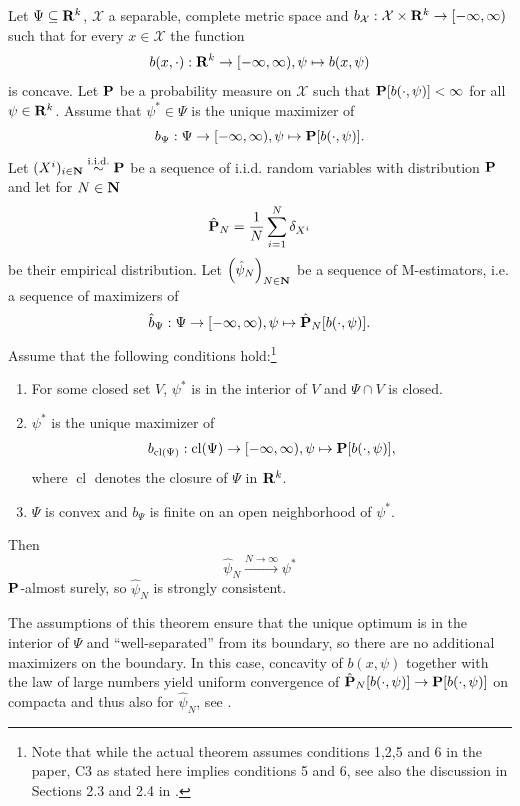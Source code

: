 \begin{theorem}
    \label{thm:haberman-consistent}
    Let $\Psi \subseteq \R^{k}$, $\mathcal X$ a separable, complete metric space and $b_{\mathcal X}: \mathcal X \times \R^{k} \to [- \infty, \infty )$ such that for every $x \in \mathcal X$ the function $$b(x, \cdot): \R^{k} \to [-\infty, \infty), \psi \mapsto b(x, \psi)$$ is concave. Let $\P$ be a probability measure on $\mathcal X$ such that $\P [b(\cdot, \psi)] < \infty$  for all $\psi \in \R^{k}$. Assume that $\psi^{\ast} \in \Psi$ is the unique maximizer of 
    $$
    b_{\Psi}: \Psi \to [-\infty, \infty), \psi \mapsto \P [b(\cdot,\psi)].
    $$ 
    Let $(X^{i})_{i \in \N} \iid \P$ be a sequence of i.i.d. random variables with distribution $\P$ and let for $N \in \N$ $$\hat \P_{N} = \frac{1}{N} \sum_{i = 1}^N \delta_{X^{i}}$$ be their empirical distribution. Let $\left(\hat\psi_{N}\right)_{N \in \N}$ be a sequence of M-estimators, i.e. a sequence of maximizers of
    $$
    \hat b_{\Psi}: \Psi \to [-\infty, \infty), \psi \mapsto \hat \P_{N} [b(\cdot, \psi)].
    $$
    Assume that the following conditions hold:\footnote{Note that while the actual theorem assumes conditions 1,2,5 and 6 in the paper, C3 as stated here implies conditions 5 and 6, see also the discussion in Sections 2.3 and 2.4 in \citep{Haberman1989Concavity}.}
    \begin{enumerate}[label=(C\arabic*),ref=(C\arabic*)]
        \item\label{it:C1} For some closed set $V$, $\psi^{\ast}$ is in the interior of $V$ and $\Psi \cap V$ is closed. 
        \item\label{it:C2} $\psi^{\ast}$ is the unique maximizer of $$b_{\operatorname{cl} (\Psi)}: \operatorname{cl} (\Psi) \to [-\infty, \infty), \psi \mapsto \P [b(\cdot, \psi)],$$ where $ \operatorname{cl}$ denotes the closure of $\Psi$ in $\R^{k}$.
        \item\label{it:C3} $\Psi$ is convex and $b_{\Psi}$ is finite on an open neighborhood of $\psi^{\ast}$.
    \end{enumerate}

    Then $$\hat \psi_{N} \stackrel{N \to \infty}\longrightarrow \psi^{\ast}$$ $\P$-almost surely, so $\hat\psi_{N}$ is strongly consistent.
\end{theorem}

The assumptions of this theorem ensure that the unique optimum is in the interior of $\Psi$ and ``{}well-separated''{} from its boundary, so there are no additional maximizers on the boundary. In this case, concavity of $b(x, \psi)$ together with the law of large numbers yield uniform convergence of $\hat \P_{N} [b(\cdot, \psi)] \to \P [b(\cdot, \psi)]$ on compacta and thus also for $\hat\psi_{N}$, see \citep[pp. 1652]{Haberman1989Concavity}.

